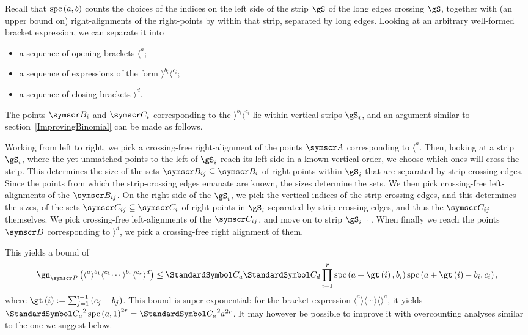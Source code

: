 Recall that $\operatorname{spc}\left(a, b\right)$ counts the choices of the indices on the left side of the strip $\gS$
of the long edges crossing $\gS$, together with (an upper bound on) right-alignments of the
right-points by within that strip, separated by long edges.
Looking at an arbitrary well-formed bracket expression, we can separate it into\begin{itemize}
\item a sequence of opening brackets $\langle^a$;
\item a sequence of expressions of the form $\rangle^{b_i}\langle^{c_i}$;
\item a sequence of closing brackets $\rangle^d$.
\end{itemize}
The points $\pointset B_i$ and $\pointset C_i$ corresponding to the $\rangle^{b_i}\langle^{c_i}$ lie
within vertical strips $\gS_i$, and an
argument similar to section~\ref{ImprovingBinomial} can be made as follows.

Working from left to right, we pick a crossing-free right-alignment of the points $\pointset A$ corresponding
to $\langle^a$. Then, looking at a strip $\gS_i$, where the yet-unmatched points to the left of $\gS_i$ reach
its left side in a known vertical order, we choose which ones will cross the strip. This determines the size of
the sets $\pointset B_{ij} \Subset \pointset B_i$ of right-points within $\gS_i$ that are separated
by strip-crossing edges. Since the points from which the strip-crossing edges emanate are known,
the sizes determine the sets. We then pick crossing-free left-alignments of the $\pointset B_{ij}$.
On the right side of the $\gS_i$, we pick the vertical indices of the
strip-crossing edges, and this determines the sizes, of the sets $\pointset C_{ij}\Subset \pointset C_i$
of right-points in $\gS_i$ separated by strip-crossing edges, and thus the $\pointset C_{ij}$ themselves.
We pick crossing-free left-alignments of the $\pointset C_{ij}$, and move on to strip $\gS_{i+1}$.
When finally we reach the points $\pointset D$ corresponding to $\rangle^d$, we pick a crossing-free right
alignment of them.

This yields a bound of\[
\gn_{\pointset P}\of{\langle^a\rangle^{b_1}\langle^{c_1}\cdots\rangle^{b_r}\langle^{c_r}\rangle^d} \leq
\CatalanNumber a \CatalanNumber d
\prod{i=1}[r]\spc\of{a+\gt\of{i},b_i}
             \spc\of{a+\gt\of{i}-b_i,c_i}\text,\]
where $\gt\of{i}\DefineAs\sum{j=1}[i-1]\pa{c_j-b_j}$.
This bound is super-exponential: for the bracket expression $\langle^a\rangle\langle\cdots\rangle\langle\rangle^a$,
it yields ${\CatalanNumber a}^2 \spc\of{a, 1}^{2r}={\CatalanNumber a}^2 a^{2r}$. It may however be possible
to improve it with overcounting analyses similar to the one we suggest below.

